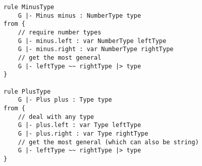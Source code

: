 \begin{lstlisting}[language=xsemantics,float,label=lst:xsem-binaryexp,caption=Some
rules for binary expressions.] 
rule MinusType
	G |- Minus minus : NumberType type
from {
	// require number types
	G |- minus.left : var NumberType leftType
	G |- minus.right : var NumberType rightType
	// get the most general
	G |- leftType ~~ rightType |> type
}

rule PlusType
	G |- Plus plus : Type type
from {
	// deal with any type
	G |- plus.left : var Type leftType
	G |- plus.right : var Type rightType
	// get the most general (which can also be string)
	G |- leftType ~~ rightType |> type
}
\end{lstlisting}




